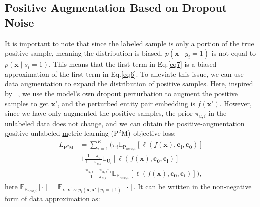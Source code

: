 \documentclass[letterpaper]{article} %
\begin{document}
\subsection{Positive Augmentation Based on Dropout Noise}

It is important to note that since the labeled sample is only a portion of the true positive sample, meaning the distribution is biased, $p(\boldsymbol{x} \mid y_{i}=1)$ is not equal to $p(\boldsymbol{x} \mid s_{i}=1)$. This means that the first term in Eq.\ref{eq7} is a biased approximation of the first term in Eq.\ref{eq6}. To alleviate this issue, we can use data augmentation to expand the distribution of positive samples. Here, inspired by ~\cite{DBLP:conf/emnlp/GaoYC21}, we use the model's own dropout perturbation to augment the positive samples to get $\boldsymbol{x'}$, and the perturbed entity pair embedding is $f(\boldsymbol{x'})$. However, since we have only augmented the positive samples, the prior $\pi_{u,i}$ in the unlabeled data does not change, and we can obtain the \underline{p}ositive-augmentation \underline{p}ositive-unlabeled \underline{m}etric learning (P$^2$M) objective loss:
\begin{equation}
\begin{aligned}\label{eq8}
L_{\mathrm{P^{2}M}}&=\sum_{i=1}^{K}(\pi_{i} \mathbb{E}_{\mathrm{P}_{new,i}}[ \ell(f(\boldsymbol{x}), \boldsymbol{c_{i}}, \boldsymbol{c_{0}})] \\
&+\frac{1-\pi_{i}}{1-\pi_{u,i}} \mathbb{E}_{\mathrm{U}_{i}}[\ell(f(\boldsymbol{x}), \boldsymbol{c_{0}}, \boldsymbol{c_{i}})] \\
&-\frac{\pi_{u,i}-\pi_{u,i} \pi_{i}}{1-\pi_{u,i}}\mathbb{E}_{\mathrm{P}_{new,i}}[\ell(f(\boldsymbol{x}), \boldsymbol{c_{0}}, \boldsymbol{c_{i}})]),
\end{aligned}
\end{equation}
here $\mathbb{E}_{\mathrm{P}_{new,i}}[\cdot]=\mathbb{E}_{\boldsymbol{x},\boldsymbol{x'} \sim p_{i}(\boldsymbol{x},\boldsymbol{x'} \mid y_{i}=+1)}[\cdot]$. It can be written in the non-negative form of data approximation as:
\end{document}
